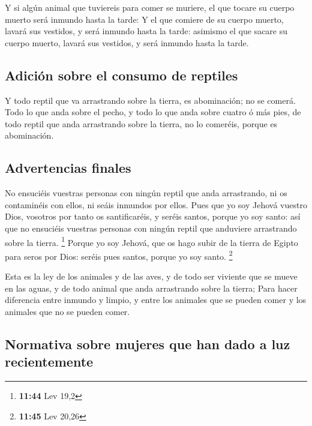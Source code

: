  Y si algún animal que tuviereis para comer se muriere,
el que tocare su cuerpo muerto será inmundo hasta la tarde:
 Y el que comiere de su cuerpo muerto, lavará sus
vestidos, y será inmundo hasta la tarde: asimismo el que sacare su
cuerpo muerto, lavará sus vestidos, y será inmundo hasta la tarde.

\hypertarget{adiciuxf3n-sobre-el-consumo-de-reptiles}{%
\subsection{Adición sobre el consumo de
reptiles}\label{adiciuxf3n-sobre-el-consumo-de-reptiles}}

 Y todo reptil que va arrastrando sobre la tierra, es
abominación; no se comerá.  Todo lo que anda sobre el
pecho, y todo lo que anda sobre cuatro ó más pies, de todo reptil que
anda arrastrando sobre la tierra, no lo comeréis, porque es abominación.

\hypertarget{advertencias-finales}{%
\subsection{Advertencias finales}\label{advertencias-finales}}

 No ensuciéis vuestras personas con ningún reptil que
anda arrastrando, ni os contaminéis con ellos, ni seáis inmundos por
ellos.  Pues que yo soy Jehová vuestro Dios, vosotros por
tanto os santificaréis, y seréis santos, porque yo soy santo: así que no
ensuciéis vuestras personas con ningún reptil que anduviere arrastrando
sobre la tierra. \footnote{\textbf{11:44} Lev 19,2} 
Porque yo soy Jehová, que os hago subir de la tierra de Egipto para
seros por Dios: seréis pues santos, porque yo soy santo. \footnote{\textbf{11:45}
  Lev 20,26}

 Esta es la ley de los animales y de las aves, y de todo
ser viviente que se mueve en las aguas, y de todo animal que anda
arrastrando sobre la tierra;  Para hacer diferencia entre
inmundo y limpio, y entre los animales que se pueden comer y los
animales que no se pueden comer.

\hypertarget{normativa-sobre-mujeres-que-han-dado-a-luz-recientemente}{%
\subsection{Normativa sobre mujeres que han dado a luz
recientemente}\label{normativa-sobre-mujeres-que-han-dado-a-luz-recientemente}}

